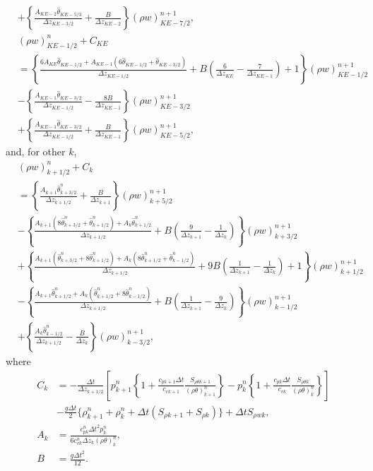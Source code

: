 \begin{align}
  &  + \left\{\frac{A_{KE-2}\hat\theta_{KE-5/3}}{\Delta z_{KE-3/2}} + \frac{B}{\Delta z_{KE-2}}\right\} (\rho w)_{KE-7/2}^{n+1}, \\
  & (\rho w)_{KE-1/2}^n + C_{KE} \nonumber \\
  &= \left\{\frac{6A_{KE}\hat\theta_{KE-1/2} + A_{KE-1}(6\hat\theta_{KE-1/2}+\hat\theta_{KE-3/2})}{\Delta z_{KE-1/2}} + B\left(\frac{6}{\Delta z_{KE}}-\frac{7}{\Delta z_{KE-1}}\right) + 1\right\} (\rho w)_{KE-1/2}^{n+1} \nonumber \\
  &- \left\{\frac{A_{KE-1}\hat\theta_{KE-3/2}}{\Delta z_{KE-1/2}} - \frac{8B}{\Delta z_{KE-1}}\right\} (\rho w)_{KE-3/2}^{n+1} \nonumber \\
  &+ \left\{\frac{A_{KE-1}\hat\theta_{KE-3/2}}{\Delta z_{KE-1/2}} + \frac{B}{\Delta z_{KE-1}}\right\} (\rho w)_{KE-5/2}^{n+1},
\end{align}
and, for other $k$,
\begin{align}
  & (\rho w)_{k+1/2}^n + C_k \\
  &= \left\{\frac{A_{k+1}\hat\theta_{k+3/2}^n}{\Delta z_{k+1/2}} + \frac{B}{\Delta z_{k+1}}\right\} (\rho w)_{k+5/2}^{n+1} \nonumber \\
  &- \left\{\frac{A_{k+1}(8\hat\theta_{k+3/2}^n+\hat\theta_{k+1/2}^n) + A_{k}\hat\theta_{k+1/2}^n}{\Delta z_{k+1/2}} + B\left(\frac{9}{\Delta z_{k+1}}-\frac{1}{\Delta z_k}\right)\right\} (\rho w)_{k+3/2}^{n+1} \nonumber \\
  &+ \left\{\frac{A_{k+1}(\hat\theta_{k+3/2}^n+8\hat\theta_{k+1/2}^n) + A_k(8\hat\theta_{k+1/2}^n+\hat\theta_{k-1/2}^n)}{\Delta z_{k+1/2}} + 9B\left(\frac{1}{\Delta z_{k+1}}-\frac{1}{\Delta z_k}\right) + 1\right\} (\rho w)_{k+1/2}^{n+1} \nonumber \\
  &- \left\{\frac{A_{k+1}\hat\theta_{k+1/2}^n + A_k(\hat\theta_{k+1/2}^n+8\hat\theta_{k-1/2}^n)}{\Delta z_{k+1/2}} + B\left(\frac{1}{\Delta z_{k+1}}-\frac{9}{\Delta z_k}\right)\right\} (\rho w)_{k-1/2}^{n+1} \nonumber \\
  &+ \left\{\frac{A_k\hat\theta_{k-1/2}^n}{\Delta z_{k+1/2}} - \frac{B}{\Delta z_k}\right\} (\rho w)_{k-3/2}^{n+1},
\end{align}
where
\begin{align}
  C_k
  &= -\frac{\Delta t}{\Delta z_{k+1/2}}\left[
    p_{k+1}^n\left\{1+\frac{c_{p k+1}\Delta t}{c_{v k+1}}\frac{S_{\rho\theta k+1}}{(\rho\theta)_{k+1}^n}\right\}
  - p_k^n   \left\{1+\frac{c_{p k}\Delta t}{c_{v k}}\frac{S_{\rho\theta k}  }{(\rho\theta)_k^n   }\right\}
    \right] \nonumber \\
  & - \frac{g\Delta t}{2}\{\rho_{k+1}^n+\rho_k^n+\Delta t(S_{\rho k+1}+S_{\rho k})\}
  + \Delta t S_{\rho w k}, \\
  A_k &= \frac{c_{p k}^n\Delta t^2 p_k^n   }{6c_{v k}^n\Delta z_{k} (\rho\theta)_k^n}, \\
  B &= \frac{g\Delta t^2}{12}.
\end{align}
